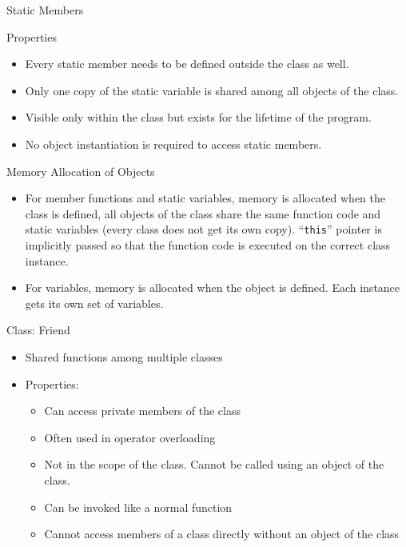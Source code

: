 \documentclass{beamer}
\begin{document}
\begin{frame}[fragile]{Static Members}
  \begin{block}{Properties}\pause
    \begin{itemize}
    \item Every static member needs to be defined outside the class as well.\pause
    \item Only one copy of the static variable is shared among all objects of the class.\pause
    \item Visible only within the class but exists for the lifetime of the program.\pause
    \item No object instantiation is required to access static members.
    \end{itemize}
  \end{block}
\end{frame}

\begin{frame}[fragile]{Memory Allocation of Objects}
  \begin{itemize}
  \item For member functions and static variables, memory is allocated when the class is defined, all objects of the class share the same function code and static variables (every class does not get its own copy). ``\texttt{this}'' pointer is implicitly passed so that the function code is executed on the correct class instance.\pause
  \item For variables, memory is allocated when the object is defined. Each instance gets its own set of variables.
  \end{itemize}
\end{frame}

\begin{frame}[fragile]{Class: Friend}
  \begin{itemize}
  \item Shared functions among multiple classes\pause
  \item Properties:\pause
    \begin{itemize}
      \item Can access private members of the class\pause
      \item Often used in operator overloading\pause
      \item Not in the scope of the class. Cannot be called using an object of the class.\pause
      \item Can be invoked like a normal function\pause
      \item Cannot access members of a class directly without an object of the class
    \end{itemize}
  \end{itemize}
\end{frame}
\end{document}
